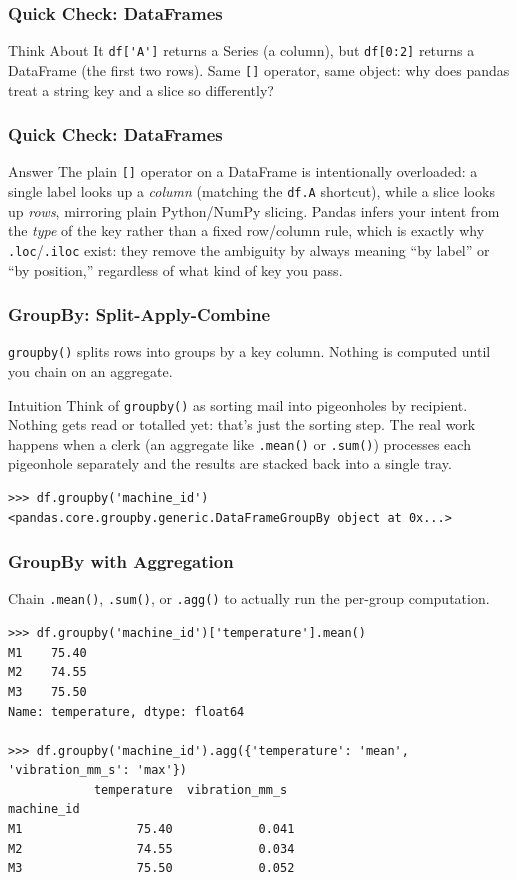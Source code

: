 \begin{frame}[fragile]\frametitle{Quick Check: DataFrames}
\begin{block}{Think About It}
\lstinline{df['A']} returns a Series (a column), but \lstinline{df[0:2]} returns a DataFrame
(the first two rows). Same \lstinline{[]} operator, same object: why does pandas treat a
string key and a slice so differently?
\end{block}
\end{frame}

\begin{frame}[fragile]\frametitle{Quick Check: DataFrames}
\begin{block}{Answer}
The plain \lstinline{[]} operator on a DataFrame is intentionally overloaded: a single label
looks up a \emph{column} (matching the \lstinline{df.A} shortcut), while a slice looks up
\emph{rows}, mirroring plain Python/NumPy slicing. Pandas infers your intent from the
\emph{type} of the key rather than a fixed row/column rule, which is exactly why
\lstinline{.loc}/\lstinline{.iloc} exist: they remove the ambiguity by always meaning
``by label'' or ``by position,'' regardless of what kind of key you pass.
\end{block}
\end{frame}

\begin{frame}[fragile]\frametitle{GroupBy: Split-Apply-Combine}
\texttt{groupby()} splits rows into groups by a key column. Nothing is computed until you chain on an aggregate.
\begin{block}{Intuition}
Think of \texttt{groupby()} as sorting mail into pigeonholes by recipient. Nothing gets read or
totalled yet: that's just the sorting step. The real work happens when a clerk (an aggregate
like \texttt{.mean()} or \texttt{.sum()}) processes each pigeonhole separately and the results
are stacked back into a single tray.
\end{block}
\begin{lstlisting}
>>> df.groupby('machine_id')
<pandas.core.groupby.generic.DataFrameGroupBy object at 0x...>
\end{lstlisting}
\end{frame}

\begin{frame}[fragile]\frametitle{GroupBy with Aggregation}
Chain \texttt{.mean()}, \texttt{.sum()}, or \texttt{.agg()} to actually run the per-group computation.
\begin{lstlisting}
>>> df.groupby('machine_id')['temperature'].mean()
M1    75.40
M2    74.55
M3    75.50
Name: temperature, dtype: float64

>>> df.groupby('machine_id').agg({'temperature': 'mean', 'vibration_mm_s': 'max'})
            temperature  vibration_mm_s
machine_id
M1                75.40            0.041
M2                74.55            0.034
M3                75.50            0.052
\end{lstlisting}
\end{frame}


